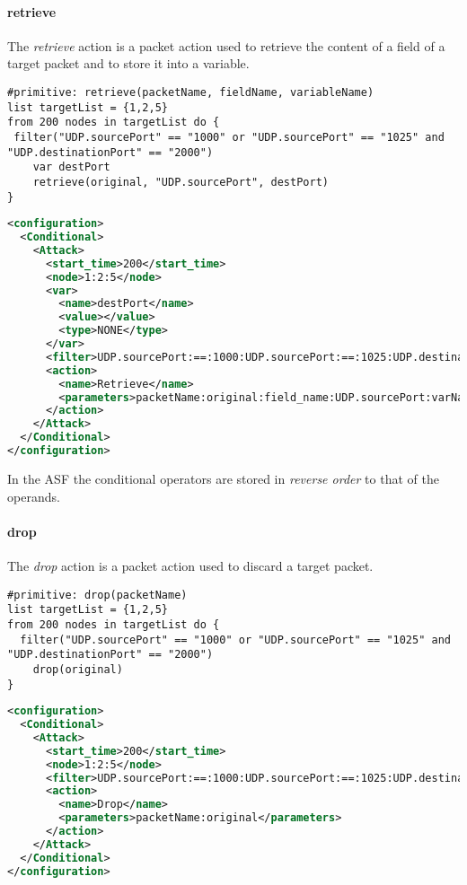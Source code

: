 \paragraph{retrieve}
The \emph{retrieve} action is a packet action used to retrieve the content of a field of a target packet and to store it into a variable.
%
\begin{lstlisting}[language={asl},caption={ASL retrieve example}]
#primitive: retrieve(packetName, fieldName, variableName)
list targetList = {1,2,5}
from 200 nodes in targetList do {
 filter("UDP.sourcePort" == "1000" or "UDP.sourcePort" == "1025" and "UDP.destinationPort" == "2000")
    var destPort
    retrieve(original, "UDP.sourcePort", destPort)
}
\end{lstlisting}
%
\begin{lstlisting}[language={xml},caption={Interpreter output}]
<configuration>
  <Conditional>
    <Attack>
      <start_time>200</start_time>
      <node>1:2:5</node>
      <var>
        <name>destPort</name>
        <value></value>
        <type>NONE</type>
      </var>
      <filter>UDP.sourcePort:==:1000:UDP.sourcePort:==:1025:UDP.destinationPort:==:2000:AND:OR</filter>
      <action>
        <name>Retrieve</name>
        <parameters>packetName:original:field_name:UDP.sourcePort:varName:destPort</parameters>
      </action>
    </Attack>
  </Conditional>
</configuration>
\end{lstlisting}
%
In the ASF the conditional operators are stored in \emph{reverse order} to that of the operands.

\paragraph{drop}
The \emph{drop} action is a packet action used to discard a target packet.
%
\begin{lstlisting}[language={asl},caption={ASL drop example}]
#primitive: drop(packetName)
list targetList = {1,2,5}
from 200 nodes in targetList do {
  filter("UDP.sourcePort" == "1000" or "UDP.sourcePort" == "1025" and "UDP.destinationPort" == "2000")
    drop(original)
}
\end{lstlisting}
%
\begin{lstlisting}[language={xml},caption={Interpreter output}]
<configuration>
  <Conditional>
    <Attack>
      <start_time>200</start_time>
      <node>1:2:5</node>
      <filter>UDP.sourcePort:==:1000:UDP.sourcePort:==:1025:UDP.destinationPort:==:2000:AND:OR</filter>
      <action>
        <name>Drop</name>
        <parameters>packetName:original</parameters>
      </action>
    </Attack>
  </Conditional>
</configuration>
\end{lstlisting}

